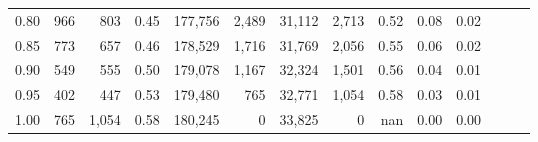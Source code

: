 \begin{tabular}{rrrrrrrrrrrrrr}
0.80 &     966 &    803 &  0.45 &  177,756 &    2,489 &  31,112 &   2,713 &  0.52 &  0.08 &      0.02 \\
0.85 &     773 &    657 &  0.46 &  178,529 &    1,716 &  31,769 &   2,056 &  0.55 &  0.06 &      0.02 \\
0.90 &     549 &    555 &  0.50 &  179,078 &    1,167 &  32,324 &   1,501 &  0.56 &  0.04 &      0.01 \\
0.95 &     402 &    447 &  0.53 &  179,480 &      765 &  32,771 &   1,054 &  0.58 &  0.03 &      0.01 \\
1.00 &     765 &  1,054 &  0.58 &  180,245 &        0 &  33,825 &       0 &   nan &  0.00 &      0.00 \\
\bottomrule
\end{tabular}
